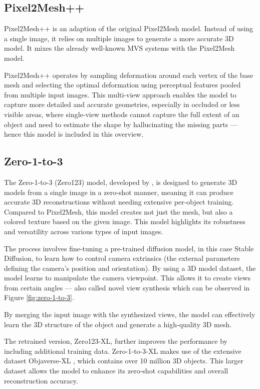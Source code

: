 \subsection{Pixel2Mesh++} \label{section:pixel2meshpp}
Pixel2Mesh++ \autocite{wen_pixel2mesh_2019} is an adaption of the original Pixel2Mesh model.  Instead of using a single image, it relies on multiple images to generate a more accurate 3D model.
It mixes the already well-known MVS systems with the Pixel2Mesh model.

Pixel2Mesh++ operates by sampling deformation around each vertex of the base mesh and selecting the optimal deformation using perceptual features pooled from multiple input images. This multi-view approach enables the model to capture more detailed and accurate geometries, especially in occluded or less visible areas, where single-view methods cannot capture the full extent of an object and need to estimate the shape by hallucinating the missing parts — hence this model is included in this overview.

\subsection{Zero-1-to-3} \label{section:zero123}
The Zero-1-to-3 (Zero123) model, developed by \textcite{liu_zero-1--3_2023}, is designed to generate 3D models from a single image in a zero-shot manner, meaning it can produce accurate 3D reconstructions without needing extensive per-object training. Compared to Pixel2Mesh, this model creates not just the mesh, but also a colored texture based on the given image. This model highlights its robustness and versatility across various types of input images.

The process involves fine-tuning a pre-trained diffusion model, in this case Stable Diffusion, to learn how to control camera extrinsics (the external parameters defining the camera's position and orientation).
By using a 3D model dataset, the model learns to manipulate the camera viewpoint. This allows it to create views from certain angles — also called novel view synthesis which can be observed in Figure \ref{fig:zero-1-to-3}.

By merging the input image with the synthesized views, the model can effectively learn the 3D structure of the object and generate a high-quality 3D mesh.

The retrained version, Zero123-XL, further improves the performance by including additional training data. Zero-1-to-3-XL makes use of the extensive dataset Objaverse-XL \autocite{deitke_objaverse-xl_2023}, which contains over 10 million 3D objects.
This larger dataset allows the model to enhance its zero-shot capabilities and overall reconstruction accuracy.

